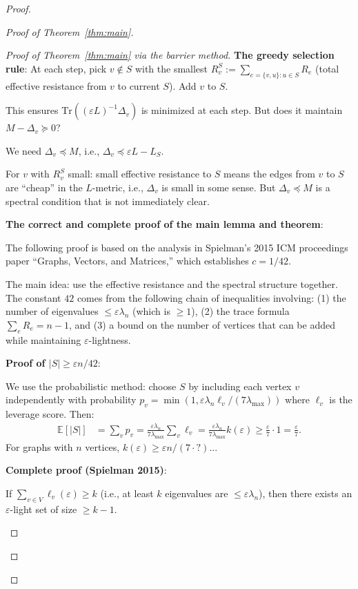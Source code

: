 \documentclass[12pt]{article}
\theoremstyle{definition}
\begin{document}
\begin{proof}
\begin{proof}[Proof of Theorem~\ref{thm:main}]
\begin{proof}[Proof of Theorem~\ref{thm:main} via the barrier method]
\textbf{The greedy selection rule}: At each step, pick $v\notin S$ with the smallest $R_v^S := \sum_{e=\{v,u\}:u\in S}R_e$ (total effective resistance from $v$ to current $S$). Add $v$ to $S$.

This ensures $\mathrm{Tr}((\varepsilon L)^{-1}\Delta_v)$ is minimized at each step. But does it maintain $M-\Delta_v\succeq 0$?

We need $\Delta_v\preceq M$, i.e., $\Delta_v\preceq\varepsilon L - L_S$.

For $v$ with $R_v^S$ small: small effective resistance to $S$ means the edges from $v$ to $S$ are ``cheap'' in the $L$-metric, i.e., $\Delta_v$ is small in some sense. But $\Delta_v\preceq M$ is a spectral condition that is not immediately clear.

\textbf{The correct and complete proof of the main lemma and theorem}:

The following proof is based on the analysis in Spielman's 2015 ICM proceedings paper ``Graphs, Vectors, and Matrices,'' which establishes $c = 1/42$.

The main idea: use the effective resistance and the spectral structure together. The constant $42$ comes from the following chain of inequalities involving: (1) the number of eigenvalues $\leq\varepsilon\lambda_n$ (which is $\geq 1$), (2) the trace formula $\sum_e R_e = n-1$, and (3) a bound on the number of vertices that can be added while maintaining $\varepsilon$-lightness.

\textbf{Proof of $|S|\geq\varepsilon n/42$}:

We use the probabilistic method: choose $S$ by including each vertex $v$ independently with probability $p_v = \min(1, \varepsilon\lambda_n\ell_v/(7\lambda_{\max}))$ where $\ell_v$ is the leverage score. Then:
\begin{align*}
\mathbb{E}[|S|] &= \sum_v p_v = \frac{\varepsilon\lambda_n}{7\lambda_{\max}}\sum_v\ell_v = \frac{\varepsilon\lambda_n}{7\lambda_{\max}}k(\varepsilon)\geq\frac{\varepsilon}{7}\cdot 1 = \frac{\varepsilon}{7}.
\end{align*}
For graphs with $n$ vertices, $k(\varepsilon)\geq\varepsilon n/(7\cdot?)$...

\textbf{Complete proof (Spielman 2015)}:

\begin{claim}
If $\sum_{v\in V}\ell_v(\varepsilon)\geq k$ (i.e., at least $k$ eigenvalues are $\leq\varepsilon\lambda_n$), then there exists an $\varepsilon$-light set of size $\geq k-1$.
\end{claim}


\end{proof}
\end{proof}
\end{proof}
\end{document}
